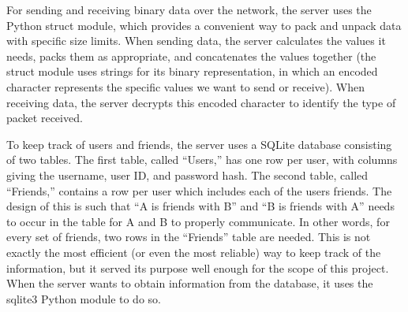 For sending and receiving binary data over the network, the server uses the Python struct
module, which provides a convenient way to pack and unpack data with specific size
limits. When sending data, the server calculates the values it needs, packs them as
appropriate, and concatenates the values together (the struct module uses strings
for its binary representation, in which an encoded character represents the specific values
we want to send or receive). When receiving data, the server decrypts this encoded character
to identify the type of packet received.

To keep track of users and friends, the server uses a SQLite database consisting of
two tables. The first table, called ``Users,'' has one row per user, with columns
giving the username, user ID, and password hash. The second table, called ``Friends,''
contains a row per user which includes each of the users friends. The design of this is such
that ``A is friends with B'' and ``B is friends with A'' needs to occur in the table
for A and B to properly communicate. In other words, for every set of friends, two rows
in the ``Friends'' table are needed. This is not exactly the most efficient (or even the
most reliable) way to keep track of the information, but it served its purpose well enough
for the scope of this project. When the server wants to obtain information from the
database, it uses the sqlite3 Python module to do so. 
